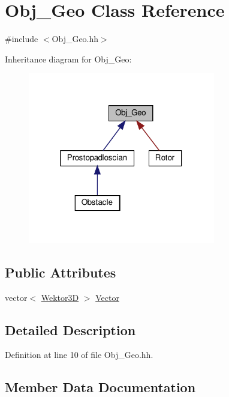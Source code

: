 \hypertarget{class_obj___geo}{}\section{Obj\+\_\+\+Geo Class Reference}
\label{class_obj___geo}


{\ttfamily \#include $<$Obj\+\_\+\+Geo.\+hh$>$}



Inheritance diagram for Obj\+\_\+\+Geo\+:
\nopagebreak
\begin{figure}[H]
\begin{center}
\leavevmode
\includegraphics[width=232pt]{class_obj___geo__inherit__graph}
\end{center}
\end{figure}
\subsection*{Public Attributes}
\begin{DoxyCompactItemize}
\item 
vector$<$ \hyperlink{_wektor3_d_8hh_ac353a272b38b4ad342f7181ad7bdb91a}{Wektor3D} $>$ \hyperlink{class_obj___geo_a3f4f092908f6269abc82a9ead4e1565b}{Vector}
\end{DoxyCompactItemize}


\subsection{Detailed Description}


Definition at line 10 of file Obj\+\_\+\+Geo.\+hh.



\subsection{Member Data Documentation}
\mbox{\label{class_obj___geo_a3f4f092908f6269abc82a9ead4e1565b}} 
